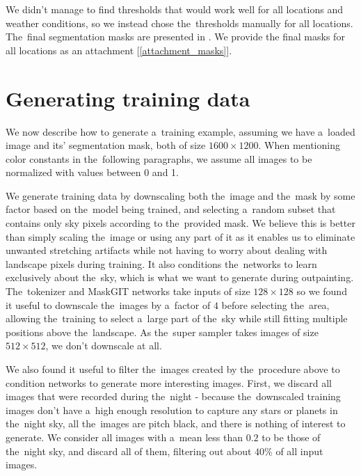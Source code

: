 We didn't manage to find thresholds that would work well for all locations and weather conditions, so we instead chose the~thresholds manually for all locations. The~final segmentation masks are presented in . We provide the final masks for all locations as an attachment [\ref{attachment_masks}].



\section{Generating training data}

We now describe how to generate a~training example, assuming we have a~loaded image and its' segmentation mask, both of size $1600 \times 1200$. When mentioning color constants in the~following paragraphs, we assume all images to be normalized with values between 0 and 1.

We generate training data by downscaling both the~image and the~mask by some factor based on the~model being trained, and selecting a~random subset that contains only sky pixels according to the~provided mask. We believe this is better than simply scaling the~image or using any part of it as it enables us to eliminate unwanted stretching artifacts while not having to worry about dealing with landscape pixels during training. It also conditions the~networks to learn exclusively about the~sky, which is what we want to generate during outpainting. The~tokenizer and MaskGIT networks take inputs of size $128 \times 128$ so we found it useful to downscale the~images by a~factor of $4$ before selecting the~area, allowing the~training to select a~large part of the~sky while still fitting multiple positions above the~landscape. As the~super sampler takes images of size $512 \times 512$, we don't downscale at all.

We also found it useful to filter the~images created by the~procedure above to condition networks to generate more interesting images. First, we discard all images that were recorded during the~night - because the~downscaled training images don't have a~high enough resolution to capture any stars or planets in the~night sky, all the~images are pitch black, and there is nothing of interest to generate. We consider all images with a~mean less than $0.2$ to be those of the~night sky, and discard all of them, filtering out about $40\%$ of all input images.

